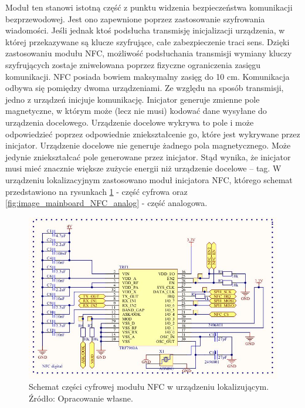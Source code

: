 Moduł ten stanowi istotną część z punktu widzenia bezpieczeństwa komunikacji bezprzewodowej. Jest ono zapewnione poprzez zastosowanie szyfrowania wiadomości. Jeśli jednak ktoś podsłucha transmisję inicjalizacji urządzenia, w której przekazywane są klucze szyfrujące, całe zabezpieczenie traci sens. Dzięki zastosowaniu modułu NFC, możliwość podsłuchania transmisji wymiany kluczy szyfrujących zostaje zniwelowana poprzez fizyczne ograniczenia zasięgu komunikacji. NFC posiada bowiem maksymalny zasięg do 10 cm.
Komunikacja odbywa się pomiędzy dwoma urządzeniami. Ze względu na sposób transmisji, jedno z urządzeń inicjuje komunikację. Inicjator generuje zmienne pole magnetyczne, w którym może (lecz nie musi) kodować dane wysyłane do urządzenia docelowego. Urządzenie docelowe wykrywa to pole i może odpowiedzieć poprzez odpowiednie zniekształcenie go, które jest wykrywane przez inicjator. Urządzenie docelowe nie generuje żadnego pola magnetycznego. Może jedynie zniekształcać pole generowane przez inicjator. Stąd wynika, że inicjator musi mieć znacznie większe zużycie energii niż urządzenie docelowe – tag. W urządzeniu lokalizacyjnym zastosowano moduł inicjatora NFC, którego schemat przedstawiono na rysunkach \ref{fig:image_mainboard_NFC_digital} - część cyfrowa oraz \ref{fig:image_mainboard_NFC_analog} - część analogowa.

\begin{figure}[H]
	\centering
	\includegraphics[width=15cm]{img/schematics/mainboard_NFC_chip.jpg}
	\caption{Schemat części cyfrowej modułu NFC w urządzeniu lokalizującym. \\ Źródło: Opracowanie własne.}
	\label{fig:image_mainboard_NFC_digital}
\end{figure}

